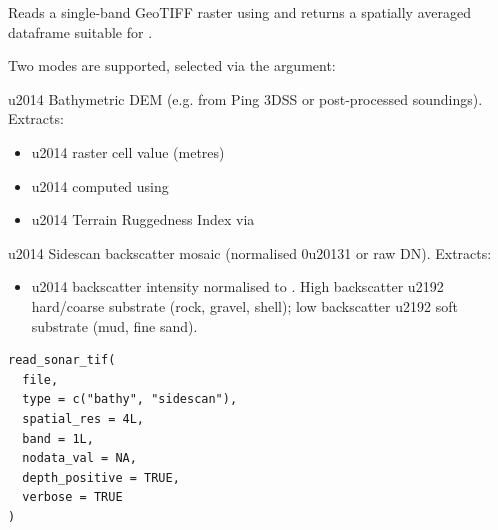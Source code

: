 \documentclass[a4paper]{book}
\begin{document}
\begin{Description}
Reads a single-band GeoTIFF raster using  and returns a spatially
averaged dataframe suitable for .

Two modes are supported, selected via the  argument:

 \bsl{}u2014 Bathymetric DEM (e.g. from Ping 3DSS or post-processed
soundings). Extracts:
\begin{itemize}

\item{}  \bsl{}u2014 raster cell value (metres)
\item{}  \bsl{}u2014 computed using 
\item{}  \bsl{}u2014 Terrain Ruggedness Index via 

\end{itemize}


 \bsl{}u2014 Sidescan backscatter mosaic (normalised 0\bsl{}u20131 or raw DN).
Extracts:
\begin{itemize}

\item{}  \bsl{}u2014 backscatter intensity normalised to .
High backscatter \bsl{}u2192 hard/coarse substrate (rock, gravel, shell);
low backscatter \bsl{}u2192 soft substrate (mud, fine sand).

\end{itemize}

\end{Description}
%
\begin{Usage}
\begin{verbatim}
read_sonar_tif(
  file,
  type = c("bathy", "sidescan"),
  spatial_res = 4L,
  band = 1L,
  nodata_val = NA,
  depth_positive = TRUE,
  verbose = TRUE
)
\end{verbatim}
\end{Usage}
%
\end{document}
